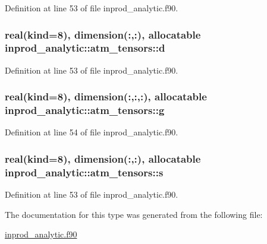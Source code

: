 Definition at line 53 of file inprod\+\_\+analytic.\+f90.

\subsubsection[{\texorpdfstring{d}{d}}]{\setlength{\rightskip}{0pt plus 5cm}real(kind=8), dimension(\+:,\+:), allocatable inprod\+\_\+analytic\+::atm\+\_\+tensors\+::d\hspace{0.3cm}{\ttfamily [private]}}\hypertarget{structinprod__analytic_1_1atm__tensors_a00e06ac193f03e4dcd337439cc489f78}{}\label{structinprod__analytic_1_1atm__tensors_a00e06ac193f03e4dcd337439cc489f78}


Definition at line 53 of file inprod\+\_\+analytic.\+f90.

\subsubsection[{\texorpdfstring{g}{g}}]{\setlength{\rightskip}{0pt plus 5cm}real(kind=8), dimension(\+:,\+:,\+:), allocatable inprod\+\_\+analytic\+::atm\+\_\+tensors\+::g\hspace{0.3cm}{\ttfamily [private]}}\hypertarget{structinprod__analytic_1_1atm__tensors_a9b4ecfbc139ac739d5ec82b087e421a5}{}\label{structinprod__analytic_1_1atm__tensors_a9b4ecfbc139ac739d5ec82b087e421a5}


Definition at line 54 of file inprod\+\_\+analytic.\+f90.

\subsubsection[{\texorpdfstring{s}{s}}]{\setlength{\rightskip}{0pt plus 5cm}real(kind=8), dimension(\+:,\+:), allocatable inprod\+\_\+analytic\+::atm\+\_\+tensors\+::s\hspace{0.3cm}{\ttfamily [private]}}\hypertarget{structinprod__analytic_1_1atm__tensors_ad95a5329b72aae59807e7cdf043ab52c}{}\label{structinprod__analytic_1_1atm__tensors_ad95a5329b72aae59807e7cdf043ab52c}


Definition at line 53 of file inprod\+\_\+analytic.\+f90.



The documentation for this type was generated from the following file\+:\begin{DoxyCompactItemize}
\item 
\hyperlink{inprod__analytic_8f90}{inprod\+\_\+analytic.\+f90}\end{DoxyCompactItemize}
